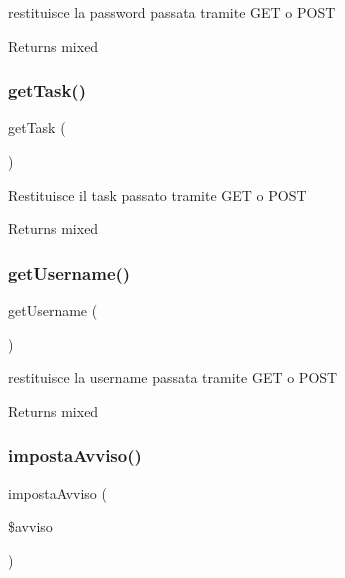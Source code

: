 restituisce la password passata tramite G\+ET o P\+O\+ST

\begin{DoxyReturn}{Returns}
mixed 
\end{DoxyReturn}
\mbox{\label{class_v_registrazione_a13871c4434338f02d6f8d430fa0597f2}} 
\subsubsection{\texorpdfstring{get\+Task()}{getTask()}}
{\footnotesize\ttfamily get\+Task (\begin{DoxyParamCaption}{ }\end{DoxyParamCaption})}

Restituisce il task passato tramite G\+ET o P\+O\+ST

\begin{DoxyReturn}{Returns}
mixed 
\end{DoxyReturn}
\mbox{\label{class_v_registrazione_a81b37a3c9d639574e394f80c1138c75e}} 
\subsubsection{\texorpdfstring{get\+Username()}{getUsername()}}
{\footnotesize\ttfamily get\+Username (\begin{DoxyParamCaption}{ }\end{DoxyParamCaption})}

restituisce la username passata tramite G\+ET o P\+O\+ST

\begin{DoxyReturn}{Returns}
mixed 
\end{DoxyReturn}
\mbox{\label{class_v_registrazione_a1039d9538af0b568d35b7afaf7cf6ff9}} 
\subsubsection{\texorpdfstring{imposta\+Avviso()}{impostaAvviso()}}
{\footnotesize\ttfamily imposta\+Avviso (\begin{DoxyParamCaption}\item[{}]{\$avviso }\end{DoxyParamCaption})}

